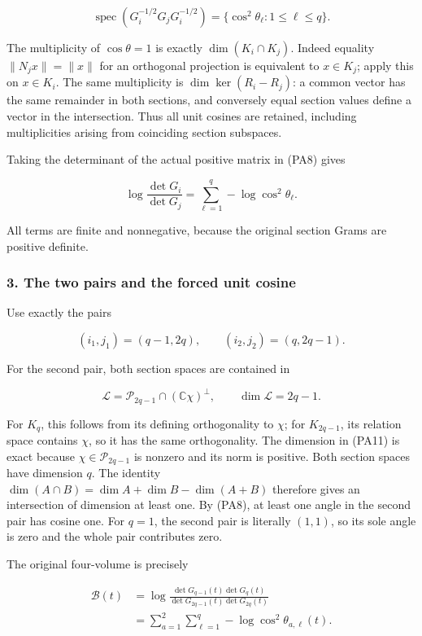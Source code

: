 \[
\boxed{\operatorname{spec}(G_i^{-1/2}G_jG_i^{-1/2})
=\{\cos^2\theta_\ell:1\le\ell\le q\}.}
\tag{PA8}
\]

The multiplicity of \(\cos\theta=1\) is exactly \(\dim(K_i\cap K_j)\). Indeed equality \(\|N_jx\|=\|x\|\) for an orthogonal projection is equivalent to \(x\in K_j\); apply this on \(x\in K_i\). The same multiplicity is \(\dim\ker(R_i-R_j)\): a common vector has the same remainder in both sections, and conversely equal section values define a vector in the intersection. Thus all unit cosines are retained, including multiplicities arising from coinciding section subspaces.

Taking the determinant of the actual positive matrix in (PA8) gives

\[
\log\frac{\det G_i}{\det G_j}
=\sum_{\ell=1}^q-\log\cos^2\theta_\ell.
\tag{PA9}
\]

All terms are finite and nonnegative, because the original section Grams are positive definite.

\subsubsection{3. The two pairs and the forced unit cosine}\label{endpoint-principal_angle_volume_review--the-two-pairs-and-the-forced-unit-cosine}

Use exactly the pairs

\[
(i_1,j_1)=(q-1,2q),\qquad
(i_2,j_2)=(q,2q-1).
\tag{PA10}
\]

For the second pair, both section spaces are contained in

\[
\mathcal L=\mathcal P_{2q-1}\cap(\mathbb C\chi)^\perp,
\qquad \dim\mathcal L=2q-1.
\tag{PA11}
\]

For \(K_q\), this follows from its defining orthogonality to \(\chi\); for \(K_{2q-1}\), its relation space contains \(\chi\), so it has the same orthogonality. The dimension in (PA11) is exact because \(\chi\in\mathcal P_{2q-1}\) is nonzero and its norm is positive. Both section spaces have dimension \(q\). The identity \(\dim(A\cap B)=\dim A+\dim B-\dim(A+B)\) therefore gives an intersection of dimension at least one. By (PA8), at least one angle in the second pair has cosine one. For \(q=1\), the second pair is literally \((1,1)\), so its sole angle is zero and the whole pair contributes zero.

The original four-volume is precisely

\[
\begin{aligned}
\mathcal B(t)
&=\log\frac{\det G_{q-1}(t)\det G_q(t)}
                {\det G_{2q-1}(t)\det G_{2q}(t)}\\
&=\sum_{a=1}^2\sum_{\ell=1}^q
          -\log\cos^2\theta_{a,\ell}(t).
\end{aligned}
\tag{PA12}
\]

